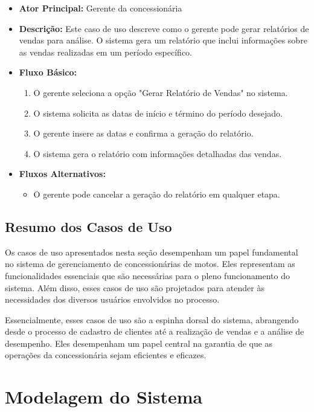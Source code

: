 \begin{itemize}
	\item \textbf{Ator Principal:} Gerente da concessionária
	\item \textbf{Descrição:} Este caso de uso descreve como o gerente pode gerar relatórios de vendas para análise. O sistema gera um relatório que inclui informações sobre as vendas realizadas em um período específico.
	\item \textbf{Fluxo Básico:}
	\begin{enumerate}
		\item O gerente seleciona a opção "Gerar Relatório de Vendas" no sistema.
		\item O sistema solicita as datas de início e término do período desejado.
		\item O gerente insere as datas e confirma a geração do relatório.
		\item O sistema gera o relatório com informações detalhadas das vendas.
	\end{enumerate}
	\item \textbf{Fluxos Alternativos:}
	\begin{itemize}
		\item O gerente pode cancelar a geração do relatório em qualquer etapa.
	\end{itemize}
\end{itemize}

\subsection{Resumo dos Casos de Uso}

Os casos de uso apresentados nesta seção desempenham um papel fundamental no sistema de gerenciamento de concessionárias de motos. Eles representam as funcionalidades essenciais que são necessárias para o pleno funcionamento do sistema. Além disso, esses casos de uso são projetados para atender às necessidades dos diversos usuários envolvidos no processo.

Essencialmente, esses casos de uso são a espinha dorsal do sistema, abrangendo desde o processo de cadastro de clientes até a realização de vendas e a análise de desempenho. Eles desempenham um papel central na garantia de que as operações da concessionária sejam eficientes e eficazes.


\section{Modelagem do Sistema}

